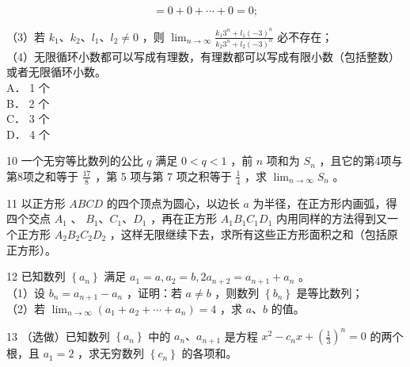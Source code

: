 \documentclass[10pt]{article}
\begin{document}
\[
=0+0+\cdots+0=0 ;
\]

（3）若 \(k_{1} 、 k_{2} 、 l_{1} 、 l_{2} \neq 0\) ，则 \(\lim _{n \rightarrow \infty} \frac{k_{1} 3^{n}+l_{1}(-3)^{n}}{k_{2} 3^{n}+l_{2}(-3)^{n}}\) 必不存在；\\
（4）无限循环小数都可以写成有理数，有理数都可以写成有限小数（包括整数）或者无限循环小数。\\
A． 1 个\\
B． 2 个\\
C． 3 个\\
D． 4 个

10 一个无穷等比数列的公比 \(q\) 满足 \(0<q<1\) ，前 \(n\) 项和为 \(S_{n}\) ，且它的第4项与第8项之和等于 \(\frac{17}{8}\) ，第 5 项与第 7 项之积等于 \(\frac{1}{4}\) ，求 \(\lim _{n \rightarrow \infty} S_{n}\) 。

11 以正方形 \(A B C D\) 的四个顶点为圆心，以边长 \(a\) 为半径，在正方形内画弧，得四个交点 \(A_{1}\) 、 \(B_{1} 、 C_{1} 、 D_{1}\) ，再在正方形 \(A_{1} B_{1} C_{1} D_{1}\) 内用同样的方法得到又一个正方形 \(A_{2} B_{2} C_{2} D_{2}\) ，这样无限继续下去，求所有这些正方形面积之和（包括原正方形）。

12 已知数列 \(\left\{a_{n}\right\}\) 满足 \(a_{1}=a, a_{2}=b, 2 a_{n+2}=a_{n+1}+a_{n}\) 。\\
（1）设 \(b_{n}=a_{n+1}-a_{n}\) ，证明：若 \(a \neq b\) ，则数列 \(\left\{b_{n}\right\}\) 是等比数列；\\
（2）若 \(\lim _{n \rightarrow \infty}\left(a_{1}+a_{2}+\cdots+a_{n}\right)=4\) ，求 \(a 、 b\) 的值。

13 （选做）已知数列 \(\left\{a_{n}\right\}\) 中的 \(a_{n} 、 a_{n+1}\) 是方程 \(x^{2}-c_{n} x+\left(\frac{1}{3}\right)^{n}=0\) 的两个根，且 \(a_{1}=2\) ，求无穷数列 \(\left\{c_{n}\right\}\) 的各项和。
\end{document}
